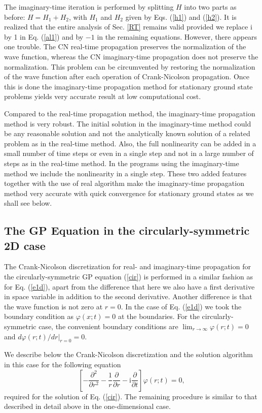 \documentclass[onecolumn]{elsart3p}
\begin{document}
The imaginary-time iteration is performed by splitting $H$ into two parts as
before: $H=H_1+H_2$, with $H_1$ and $H_2$ given by Eqs. (\ref{h1}) and
(\ref{h2}). It is realized that the entire analysis of Sec. \ref{RT} remains
valid provided we replace $\mbox{i}$ by 1 in Eq. (\ref{al1}) and by $-1$ in the
remaining equations. However, there appears one trouble.  The CN real-time
propagation preserves the normalization of the wave function, whereas the CN
imaginary-time propagation does not preserve the normalization. This problem can
be circumvented by restoring the normalization of the wave function after each
operation of Crank-Nicolson propagation. Once this is done the imaginary-time
propagation method for  stationary ground state problems yields very 
accurate result at
low computational cost.

Compared to the real-time propagation method, the imaginary-time
propagation method is very robust. The initial solution in the 
imaginary-time method 
could be any reasonable solution and not the analytically known solution
of a related problem as in the real-time method. { Also, the
full  nonlinearity can be added in a small number of time steps or even
in a single step and not in a large number of  steps as in the real-time 
method.} In the programs using the imaginary-time method  we include the 
 nonlinearity in a single step.  These two 
added features  together with
the use of real algorithm make the imaginary-time propagation method
very accurate with quick convergence for stationary ground states as we 
shall
see below.


\subsection{The GP Equation in the circularly-symmetric 2D
case}
\label{gp2dc}


The Crank-Nicolson discretization for real- and imaginary-time propagation for
the circularly-symmetric GP equation (\ref{cir}) is performed in a similar
fashion as for Eq. (\ref{e1d}), apart from the difference that here we also have
a first derivative in space variable in addition to the second derivative.
Another difference is that the wave function is not zero at $r=0$. In the case
of Eq. (\ref{e1d}) we took the boundary condition as $\varphi(x;t)=0$ at the
boundaries. For the circularly-symmetric case, the convenient boundary
conditions are $\lim_{r\to \infty}\varphi(r;t)=0$ and $d\varphi
(r;t)/dr|_{r=0}=0$.

We describe below the Crank-Nicolson discretization and the solution
algorithm in this case for the following equation
\begin{equation}
\left[-\frac{\partial^2}
{\partial r^2}-\frac{1}{r}\frac{\partial}
{\partial r}  -
\mbox{i}\frac{\partial }{\partial t}\right] \varphi
(r;t)=0,
\label{CNCIR}
\end{equation}
required for the solution of Eq. (\ref{cir}). The remaining procedure is
similar to that described in detail above in the one-dimensional case.
\end{document}
